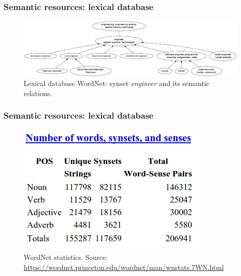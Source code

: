 \begin{frame}
\frametitle{Semantic resources: lexical database }

\begin{figure}
\centering
\includegraphics[width=1.0\textwidth]{figures/wordnet-new}
\caption{ Lexical database WordNet: synset \textit{engineer} and its semantic relations. }
\label{fig:wordnet}
\end{figure}
\end{frame}


\begin{frame}
\frametitle{Semantic resources: lexical database}

\begin{figure}
\centering
\includegraphics[width=.7\textwidth]{figures/wnstat}
\caption{ WordNet statistics. Source: \url{https://wordnet.princeton.edu/wordnet/man/wnstats.7WN.html} }
\label{fig:wordnet}
\end{figure}
\end{frame}



